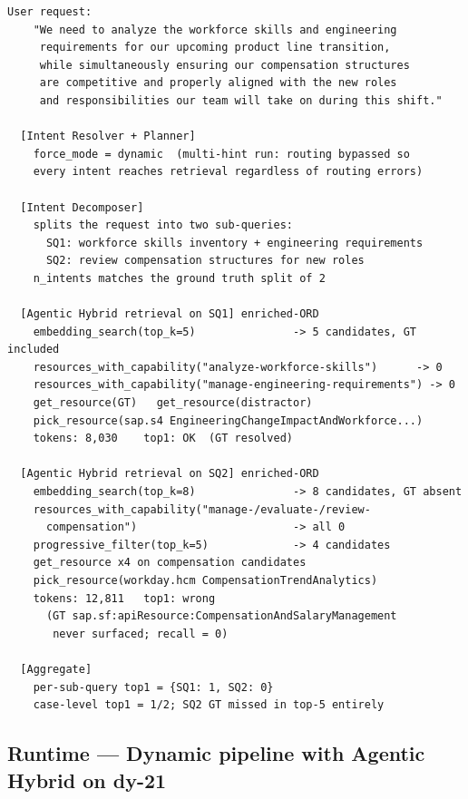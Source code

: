 \begin{lstlisting}[float=!t, floatplacement=!t, basicstyle=\ttfamily\scriptsize, breaklines=true, frame=single, label={lst:trace-dy21-pipeline}, caption={End-to-end pipeline trace for \texttt{dy-21} with Agentic Hybrid on Enriched-ORD. Routing produces the inputs that retrieval consumes.}]
  User request:
    "We need to analyze the workforce skills and engineering
     requirements for our upcoming product line transition,
     while simultaneously ensuring our compensation structures
     are competitive and properly aligned with the new roles
     and responsibilities our team will take on during this shift."
  
  [Intent Resolver + Planner]
    force_mode = dynamic  (multi-hint run: routing bypassed so
    every intent reaches retrieval regardless of routing errors)
  
  [Intent Decomposer]
    splits the request into two sub-queries:
      SQ1: workforce skills inventory + engineering requirements
      SQ2: review compensation structures for new roles
    n_intents matches the ground truth split of 2
  
  [Agentic Hybrid retrieval on SQ1] enriched-ORD
    embedding_search(top_k=5)               -> 5 candidates, GT included
    resources_with_capability("analyze-workforce-skills")      -> 0
    resources_with_capability("manage-engineering-requirements") -> 0
    get_resource(GT)   get_resource(distractor)
    pick_resource(sap.s4 EngineeringChangeImpactAndWorkforce...)
    tokens: 8,030    top1: OK  (GT resolved)
  
  [Agentic Hybrid retrieval on SQ2] enriched-ORD
    embedding_search(top_k=8)               -> 8 candidates, GT absent
    resources_with_capability("manage-/evaluate-/review-
      compensation")                        -> all 0
    progressive_filter(top_k=5)             -> 4 candidates
    get_resource x4 on compensation candidates
    pick_resource(workday.hcm CompensationTrendAnalytics)
    tokens: 12,811   top1: wrong
      (GT sap.sf:apiResource:CompensationAndSalaryManagement
       never surfaced; recall = 0)
  
  [Aggregate]
    per-sub-query top1 = {SQ1: 1, SQ2: 0}
    case-level top1 = 1/2; SQ2 GT missed in top-5 entirely
  \end{lstlisting}

\subsection{Runtime --- Dynamic pipeline with Agentic Hybrid on dy-21}
\label{appendix:trace-rt-pipeline-dy-21}

